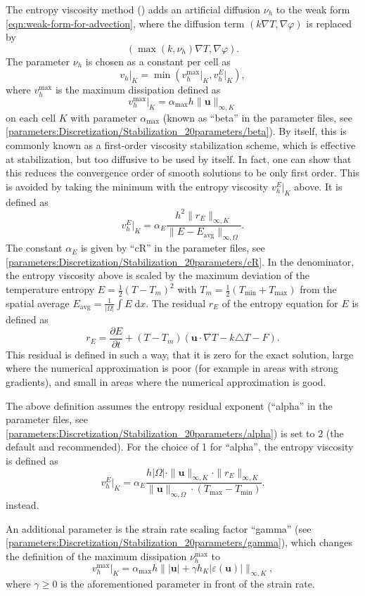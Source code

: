 \documentclass{article}
\begin{document}
The entropy viscosity method (\cite{GPP11,KHB12}) adds an artificial diffusion $\nu_h$ to the weak form \eqref{eqn:weak-form-for-advection}, where the diffusion term $\left (k\nabla T, \nabla \varphi \right)$ is replaced by
\[
\left(\max (k, \nu_h) \nabla T, \nabla \varphi \right).
\]
The parameter $\nu_h$ is chosen as a constant per cell as
\[
 v_h \vert_K = \min \left( v_h^\text{max} \vert_K, v_h^E \vert_K \right),
\]
where $v_h^\text{max}$ is the maximum dissipation defined as
\[
 v_h^\text{max} \vert_K = \alpha_\text{max} h \| \mathbf u \|_{\infty,K}
\]
on each cell $K$ with parameter $\alpha_\text{max}$ (known as ``beta'' in the parameter
files, see  \ref{parameters:Discretization/Stabilization_20parameters/beta}). By itself, this is commonly known as a first-order viscosity
stabilization scheme, which is effective at stabilization, but too diffusive to
be used by itself. In fact, one can show that this reduces the convergence order
of smooth solutions to be only first order.
This is avoided by taking the minimum with the entropy viscosity $v_h^E|_K$
above. It is defined as
\[
 v_h^E \vert_K = \alpha_E \frac{h^2 \| r_E \|_{\infty, K}}{\| E - E_\text{avg} \|_{\infty, \Omega}}.
\]
The constant $\alpha_E$ is given by ``cR'' in the parameter files, see \ref{parameters:Discretization/Stabilization_20parameters/cR}.
In the denominator, the entropy viscosity above is scaled by
the maximum deviation of the temperature
entropy $E=\frac{1}{2}(T-T_m)^2$ with $T_m = \frac{1}{2}(T_\text{min}+T_\text{max})$
from the spatial average $E_\text{avg} = \frac{1}{| \Omega |}\int E \;\text{d}x$.
The residual $r_E$ of the entropy equation for $E$ is defined as
\[
 r_E = \frac{\partial E}{\partial t} + (T-T_m)(\mathbf{u}\cdot \nabla T - k\triangle T - F).
\]
This residual is defined in such a way, that it is zero for the exact solution, large
where the numerical approximation is poor (for example in areas with strong gradients),
and small in areas where the numerical approximation is good.

The above definition assumes the entropy residual exponent (``alpha'' in the parameter files,
see \ref{parameters:Discretization/Stabilization_20parameters/alpha}) is set to 2 (the default
and recommended). For the choice of 1 for ``alpha'', the entropy viscosity is defined as
\[
 v_h^E \vert_K = \alpha_E \frac{h |\Omega| \cdot \| \mathbf u \|_{\infty,K} \cdot \| r_E \|_{\infty, K}}
 {\| \mathbf u \|_{\infty,\Omega} \cdot (T_\text{max} - T_\text{min})}.
\]
instead.

An additional parameter is the strain rate scaling factor ``gamma'' (see \ref{parameters:Discretization/Stabilization_20parameters/gamma}), which changes the definition
of the maximum dissipation $\nu_h^\text{max}$ to
\[
 v_h^\text{max} \vert_K = \alpha_\text{max} h \|\lvert\mathbf u\rvert + \gamma h_K \lvert\varepsilon (\mathbf u)\rvert\|_{\infty,K},
\]
where $\gamma\geq 0$ is the aforementioned parameter in front of the strain rate.
\end{document}
